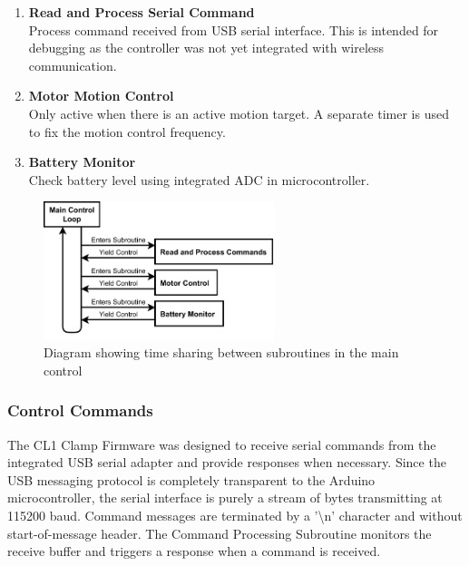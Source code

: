 \begin{enumerate}
    \item \textbf{Read and Process Serial Command} \\ Process command received from USB serial interface. This is intended for debugging as the controller was not yet integrated with wireless communication. 
    \item \textbf{Motor Motion Control} \\ Only active when there is an active motion target. A separate timer is used to fix the motion control frequency. 
    \item \textbf{Battery Monitor}\\ Check battery level using integrated ADC in microcontroller. 
\end{enumerate}

\begin{figure}[h]
    \centering
    \vskip 20pt
    \includegraphics[width=0.60\textwidth]{images/04-3/cl1-firmware-mainloop.pdf}
    \caption{Diagram showing time sharing between subroutines in the main control}
    \label{fig:firmware-motion-control-timeshare}
\end{figure}

\FloatBarrier

\subsubsection{Control Commands}
\label{subsubsection:exploration-1-control-commands}

The CL1 Clamp Firmware was designed to receive serial commands from the integrated USB serial adapter and provide responses when necessary. Since the USB messaging protocol is completely transparent to the Arduino microcontroller, the serial interface is purely a stream of bytes transmitting at 115200 baud. Command messages are terminated by a '\textbackslash n' character and without start-of-message header. The Command Processing Subroutine monitors the receive buffer and triggers a response when a command is received.

